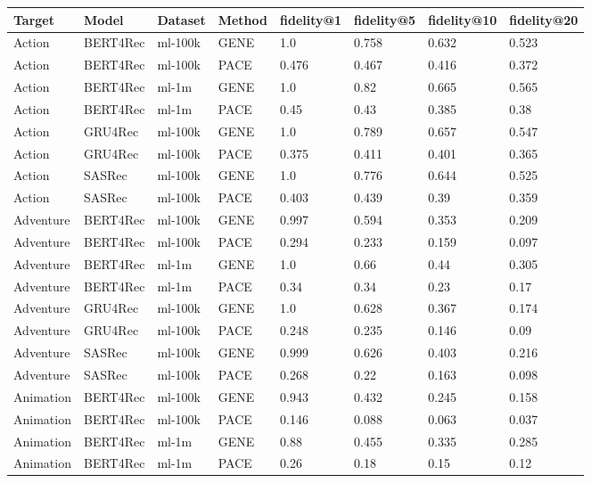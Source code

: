 \begingroup
    \setlength{\tabcolsep}{6pt} %
    \renewcommand{\arraystretch}{1.2} %
    \small %
    \begin{longtable}{|l|l|l|l|l|l|l|l|}
    \hline
\textbf{Target} & \textbf{Model} & \textbf{Dataset} & \textbf{Method} & \textbf{fidelity@1} & \textbf{fidelity@5} & \textbf{fidelity@10} & \textbf{fidelity@20} \\ \hline
\endhead
Action & BERT4Rec & ml-100k & GENE & 1.0 & 0.758 & 0.632 & 0.523 \\
Action & BERT4Rec & ml-100k & PACE & 0.476 & 0.467 & 0.416 & 0.372 \\\hline
Action & BERT4Rec & ml-1m & GENE & 1.0 & 0.82 & 0.665 & 0.565 \\
Action & BERT4Rec & ml-1m & PACE & 0.45 & 0.43 & 0.385 & 0.38 \\\hline
Action & GRU4Rec & ml-100k & GENE & 1.0 & 0.789 & 0.657 & 0.547 \\
Action & GRU4Rec & ml-100k & PACE & 0.375 & 0.411 & 0.401 & 0.365 \\\hline
Action & SASRec & ml-100k & GENE & 1.0 & 0.776 & 0.644 & 0.525 \\
Action & SASRec & ml-100k & PACE & 0.403 & 0.439 & 0.39 & 0.359 \\\hline
Adventure & BERT4Rec & ml-100k & GENE & 0.997 & 0.594 & 0.353 & 0.209 \\
Adventure & BERT4Rec & ml-100k & PACE & 0.294 & 0.233 & 0.159 & 0.097 \\\hline
Adventure & BERT4Rec & ml-1m & GENE & 1.0 & 0.66 & 0.44 & 0.305 \\
Adventure & BERT4Rec & ml-1m & PACE & 0.34 & 0.34 & 0.23 & 0.17 \\\hline
Adventure & GRU4Rec & ml-100k & GENE & 1.0 & 0.628 & 0.367 & 0.174 \\
Adventure & GRU4Rec & ml-100k & PACE & 0.248 & 0.235 & 0.146 & 0.09 \\\hline
Adventure & SASRec & ml-100k & GENE & 0.999 & 0.626 & 0.403 & 0.216 \\
Adventure & SASRec & ml-100k & PACE & 0.268 & 0.22 & 0.163 & 0.098 \\\hline
Animation & BERT4Rec & ml-100k & GENE & 0.943 & 0.432 & 0.245 & 0.158 \\
Animation & BERT4Rec & ml-100k & PACE & 0.146 & 0.088 & 0.063 & 0.037 \\\hline
Animation & BERT4Rec & ml-1m & GENE & 0.88 & 0.455 & 0.335 & 0.285 \\
Animation & BERT4Rec & ml-1m & PACE & 0.26 & 0.18 & 0.15 & 0.12 \\\hline

\end{longtable}
